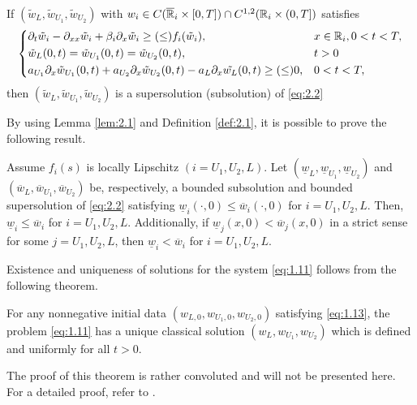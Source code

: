 \begin{definition}
    If \((\tilde{w}_L, \tilde{w}_{U_1}, \tilde{w}_{U_2})\) with \(w_i \in C(\overline{\mathbb{R}}_i \times [0, T]) \cap C^{1,2}(\mathbb{R}_i \times (0, T])\) satisfies 
    \begin{equation}
        \begin{dcases}
            \partial_t \tilde{w}_i - \partial_{xx} \tilde{w}_i + \beta_i \partial_x \tilde{w}_i \geq (\leq) f_i(\tilde{w}_i), & x \in \mathbb{R}_i, 0 < t < T, \\
            \tilde{w}_L(0, t) = \tilde{w}_{U_1}(0, t) = \tilde{w}_{U_2}(0, t), & t > 0 \\
            a_{U_1} \partial_x \tilde{w}_{U_1}(0, t) + a_{U_2} \partial_x \tilde{w}_{U_2}(0, t) - a_L \partial_x \tilde{w_L}(0, t) \geq (\leq) 0, & 0 < t < T, \\
        \end{dcases}
        \label{eq:2.2}
    \end{equation}
    then \((\tilde{w}_L, \tilde{w}_{U_1}, \tilde{w}_{U_2})\) is a supersolution (subsolution) of \ref{eq:2.2}
    \label{def:2.1}
\end{definition}

By using Lemma \ref{lem:2.1} and Definition \ref{def:2.1}, it is possible to prove the following result.

\begin{lemma}
    Assume \(f_i(s)\) is locally Lipschitz \((i = U_1, U_2, L)\). Let \((\underline{w}_L, \underline{w}_{U_1}, \underline{w}_{U_2})\) and \((\overline{w}_L, \overline{w}_{U_1}, \overline{w}_{U_2})\) be, respectively, a bounded subsolution and bounded supersolution of \ref{eq:2.2} satisfying \(\underline{w}_i(\cdot, 0) \leq \overline{w}_i(\cdot, 0)\) for \(i = U_1, U_2, L\). Then, \(\underline{w}_i \leq \overline{w}_i\) for \(i = U_1, U_2, L\). Additionally, if \(\underline{w}_j(x,0) < \overline{w}_j(x,0)\) in a strict sense for some \(j = U_1, U_2, L\), then \(\underline{w}_i < \overline{w}_i\) for \(i = U_1, U_2, L\).
    \label{lem:2.2} 
\end{lemma}
Existence and uniqueness of solutions for the system \ref{eq:1.11} follows from the following theorem.
\begin{theorem}
    For any nonnegative initial data \((w_{L,0}, w_{U_1,0}, w_{U_2,0})\) satisfying \eqref{eq:1.13}, the problem \eqref{eq:1.11} has a unique classical solution \((w_L, w_{U_1}, w_{U_2})\) which is defined and uniformly for all \(t > 0\).
    \label{thm:2.4}
\end{theorem}
The proof of this theorem is rather convoluted and will not be presented here. For a detailed proof, refer to \cite{du2019fisherkpp}.


